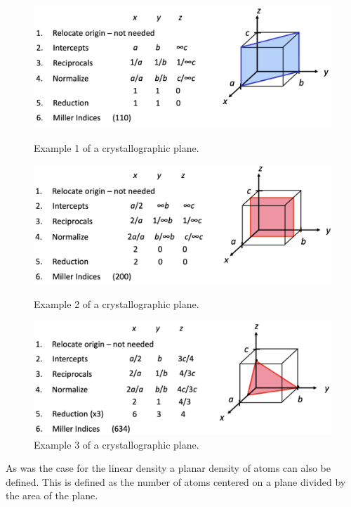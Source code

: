 \begin{figure}[ht]
  \centering
  \begin{minipage}[t]{0.32\textwidth}
    \centering
    \includegraphics[width=\linewidth]{./figures/f3_6.png}
    \caption{Example 1 of a crystallographic plane.}
    \label{fig:f3_6}
  \end{minipage}%
  \hfill
  \begin{minipage}[t]{0.32\textwidth}
    \centering
    \includegraphics[width=\linewidth]{./figures/f3_7.png}
    \caption{Example 2 of a crystallographic plane.}
    \label{fig:f3_7}
  \end{minipage}%
  \hfill
  \begin{minipage}[t]{0.32\textwidth}
    \centering
    \includegraphics[width=\linewidth]{./figures/f3_8.png}
    \caption{Example 3 of a crystallographic plane.}
    \label{fig:f3_8}
  \end{minipage}
\end{figure}

\begin{definition}
  As was the case for the linear density a planar density of atoms can also be defined. This is defined as the number of atoms centered on a plane divided by the area of the plane. 
\end{definition}
